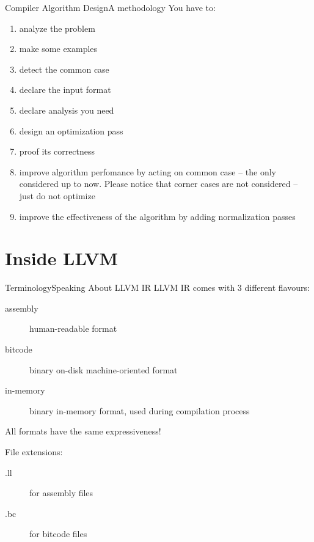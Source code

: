 \documentclass[10pt,mathserif]{beamer}
\begin{document}
\begin{frame}{Compiler Algorithm Design}{A methodology}
You have to:

\begin{enumerate}
\item analyze the problem
\item make some examples
\item detect the common case
\item declare the \alert{input format}
\item declare \alert{analysis} you need
\item design an \alert{optimization} pass
\item proof its \alert{correctness}
\item improve algorithm perfomance by acting on common case -- the only
      considered up to now. Please notice that corner cases are not considered
      -- just do not optimize
\item improve the effectiveness of the algorithm by adding
      \alert{normalization passes}
\end{enumerate}
\end{frame}

\section{Inside LLVM}
\begin{frame}{Terminology}{Speaking About LLVM IR}
LLVM IR comes with 3 different flavours:

\begin{description}
\item[assembly] human-readable format
\item[bitcode] binary on-disk machine-oriented format
\item[in-memory] binary in-memory format, used during compilation process
\end{description}

All formats have the same expressiveness!

\bigskip
File extensions:

\begin{description}
\item[.ll] for assembly files
\item[.bc] for bitcode files
\end{description}
\end{frame}
\end{document}
